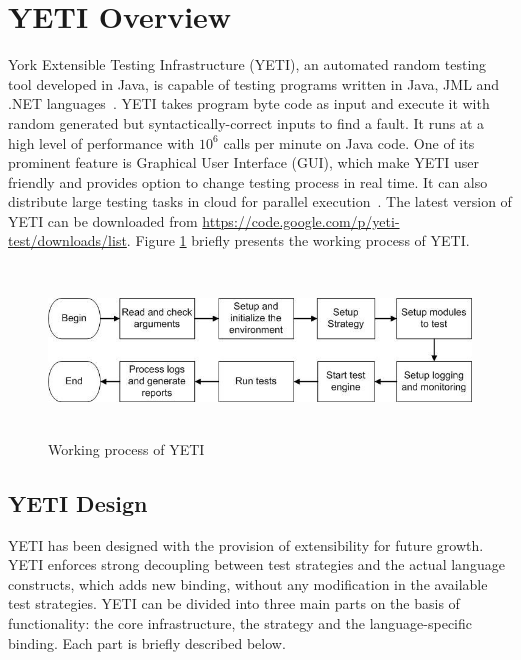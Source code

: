 
\newpage

\section{YETI Overview}
York Extensible Testing Infrastructure (YETI), an automated random testing tool developed in Java, is capable of testing programs written in Java, JML and .NET languages~\cite{Oriol2010c}. YETI takes program byte code as input and execute it with random generated but syntactically-correct inputs to find a fault. It runs at a high level of performance with $10^6$ calls per minute on Java code. One of its prominent feature is Graphical User Interface (GUI), which make YETI user friendly and provides option to change testing process in real time. It can also distribute large testing tasks in cloud for parallel execution~\cite{Oriol2010}. The latest version of YETI can be downloaded from \url{https://code.google.com/p/yeti-test/downloads/list}. Figure \ref{fig:yetiOverview} briefly presents the working process of YETI. 
\\

\begin{figure}[h]
	\centering
	\includegraphics[width=15cm, height=4.5cm]{chapter3/yetiOverview.png}
	\caption{Working process of YETI}
	\label{fig:yetiOverview}
\end{figure}


\subsection{YETI Design}
YETI has been designed with the provision of extensibility for future growth. YETI enforces strong decoupling between test strategies and the actual language constructs, which adds new binding, without any modification in the available test strategies. YETI can be divided into three main parts on the basis of functionality: the core infrastructure, the strategy and the language-specific binding. Each part is briefly described below. 

